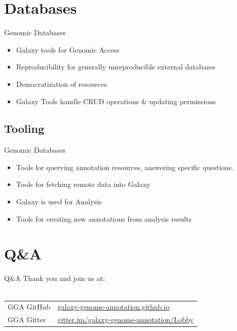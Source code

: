 \documentclass[12pt]{phage3slides} %
\begin{document}
\section{Databases}

\begin{frame}{Genomic Databases}
    \begin{itemize}
        \item Galaxy tools for Genomic Access
        \item Reproducibility for generally unreproducible external databases
        \item Democratization of resources%
        \item Galaxy Tools handle CRUD operations \& updating permissions
    \end{itemize}
\end{frame}

\subsection{Tooling}
\begin{frame}{Genomic Databases}
    \begin{itemize}
        \item Tools for querying annotation resources, answering specific questions. %
        \item Tools for fetching remote data into Galaxy
        \item Galaxy is used for Analysis
        \item Tools for creating new annotations from analysis results
    \end{itemize}
\end{frame}





\section{Q\&A}
\begin{frame}{Q\&A}
    Thank you and join us at:\\\ \\
    \begin{center}
        \begin{tabular}{ll}
            \color{gray} GGA GitHub & \href{https://galaxy-genome-annotation.github.io/}{galaxy-genome-annotation.github.io}\\
            \color{gray} GGA Gitter & \href{https://gitter.im/galaxy-genome-annotation/Lobby}{gitter.im/galaxy-genome-annotation/Lobby}\\
            \end{tabular}\\[1cm]
            \fundingNSFABIannotation
    \end{center}
\end{frame}
\end{document}
